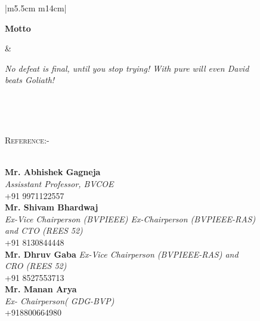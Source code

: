 \documentclass[11pt]{article}
\begin{document}
\begin{figure}[ht]
\begin{tabular}{ |m{5.5cm} m{14cm}| }
\begin{flushleft}
\textbf{{ Motto }}

\end{flushleft}&\begin{center}\textit{ No defeat is final, until you stop trying! With pure will even David beats Goliath! }\end{center}\\

\hline
\end{tabular}\\
\vspace{5mm}
\begin{minipage}[b]{0.45\linewidth}
\flushleft
\noindent\colorbox{WeakOrange}
{\parbox{\dimexpr\textwidth-2\fboxsep\relax}{\textsc{Reference:-}}}\\
\vspace{3mm}
\textbf{Mr. Abhishek Gagneja}\\
\textit{Assisstant Professor, BVCOE}\\
+91 9971122557\\
\vspace{3mm}
\textbf{Mr. Shivam Bhardwaj}\\
\textit{ Ex-Vice Chairperson (BVPIEEE) Ex-Chairperson (BVPIEEE-RAS) and CTO (REES 52)}\\
+91 8130844448\\
\vspace{3mm}
\textbf{Mr. Dhruv Gaba}
\textit{ Ex-Vice Chairperson (BVPIEEE-RAS) and CRO (REES 52)}\\
+91 8527553713\\
\vspace{3mm}
\textbf{Mr. Manan Arya}\\
\textit{Ex- Chairperson( GDG-BVP)}\\
+918800664980\\

\end{minipage}
\end{figure}
\end{document}
